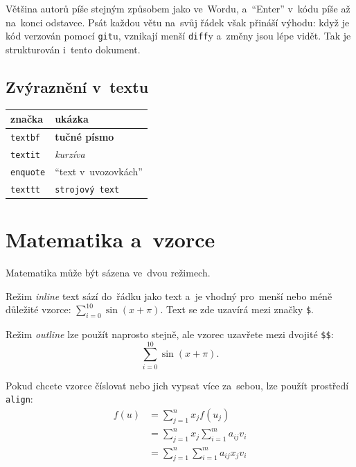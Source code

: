 Většina autorů píše stejným způsobem jako ve~Wordu, a~\enquote{Enter} v~kódu píše až na~konci odstavce.
Psát každou větu na~svůj řádek však přináší výhodu: když je kód verzován pomocí \texttt{git}u, vznikají menší \texttt{diff}y a~změny jsou lépe vidět.
Tak je strukturován i~tento dokument.
 
\subsection{Zvýraznění v~textu}

\begin{table}[ht]
\centering
\begin{tabular}{|l|l|}
značka & ukázka \\
\hline \hline
\texttt{textbf} & \textbf{tučné písmo} \\
\texttt{textit} & \emph{kurzíva} \\
\texttt{enquote} & \enquote{text v~uvozovkách} \\
\texttt{texttt} & \texttt{strojový text} \\
\end{tabular}
\end{table}

\clearpage
\section{Matematika a~vzorce}

Matematika může být sázena ve~dvou režimech.

Režim \emph{inline} text sází do~řádku jako text a~je vhodný pro~menší nebo méně důležité vzorce:
$\sum_{i=0}^{10} \sin (x + \pi)$.
Text se zde uzavírá mezi značky \verb|$|.

Režim \emph{outline} lze použít naprosto stejně, ale vzorec uzavřete mezi dvojité \verb|$$|:
$$\sum_{i=0}^{10} \sin (x + \pi).$$

Pokud chcete vzorce číslovat nebo jich vypsat více za~sebou, lze použít prostředí \texttt{align}:
\begin{align*}
f(u) & =\sum_{j=1}^{n} x_jf(u_j) \\
     & =\sum_{j=1}^{n} x_j \sum_{i=1}^{m} a_{ij}v_i \\
     & =\sum_{j=1}^{n} \sum_{i=1}^{m} a_{ij}x_jv_i
\end{align*}

